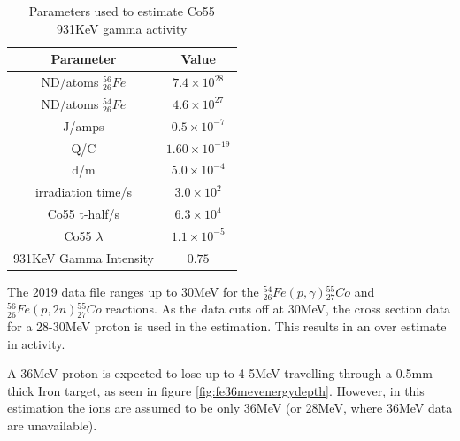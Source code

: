 \FloatBarrier
\begin{table}[h]
\begin{center}
\begin{tabular}{c c}
\hline\hline
Parameter & Value\\
\hline\hline
ND/atoms ${}^{56}_{26}Fe$ & $7.4 \times 10^{28}$ \\
ND/atoms ${}^{54}_{26}Fe$ & $4.6 \times 10^{27}$ \\
J/amps & $0.5 \times 10^{-7}$ \\
Q/C & $1.60 \times 10^{-19}$ \\
d/m & $5.0 \times 10^{-4}$ \\
irradiation time/s & $3.0 \times 10^{2}$ \\
Co55 t-half/s & $6.3 \times 10^{4}$ \\
Co55 $\lambda$ & $1.1 \times 10^{-5}$ \\
931KeV Gamma Intensity & $0.75$ \\
\hline\hline
\end{tabular}
\end{center}
\caption{Parameters used to estimate Co55 931KeV gamma activity}
\label{table:activityestimation1}
\end{table}

The 2019 data file ranges up to 30MeV for the ${}^{54}_{26} Fe (p, \gamma) {}^{55}_{27} Co$ and ${}^{56}_{26} Fe (p, 2n) {}^{55}_{27} Co$ reactions.  As the data cuts off at 30MeV, the cross section data for a 28-30MeV proton is used in the estimation.  This results in an over estimate in activity.

A 36MeV proton is expected to lose up to 4-5MeV travelling through a 0.5mm thick Iron target, as seen in figure \ref{fig:fe36mevenergydepth}.  However, in this estimation the ions are assumed to be only 36MeV (or 28MeV, where 36MeV data are unavailable).

